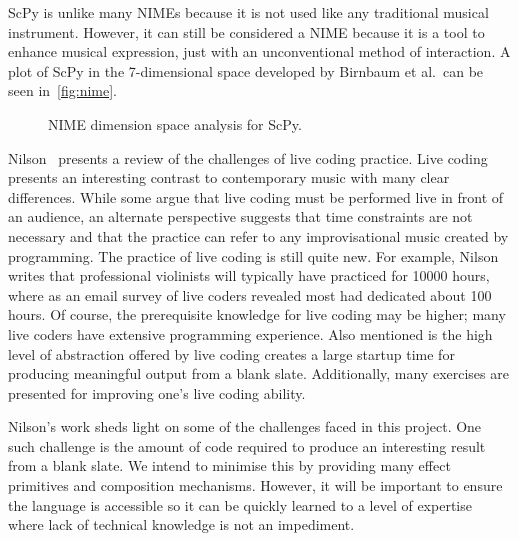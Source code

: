 \documentclass{article}
\begin{document}
ScPy is unlike many NIMEs because it is not used like any traditional musical instrument.
However, it can still be considered a NIME because it is a tool to enhance musical expression,
just with an unconventional method of interaction. A plot of ScPy in the 7-dimensional space
developed by Birnbaum et al.\ can be seen in~\autoref{fig:nime}.

\begin{figure}[ht]
    \caption{NIME dimension space analysis for ScPy.}\label{fig:nime}
    \begin{center}
    \end{center}
\end{figure}

Nilson~\cite{nilson2007live} presents a review of the challenges of live coding practice. Live
coding presents an interesting contrast to contemporary music with many clear differences.  While
some argue that live coding must be performed live in front of an audience, an alternate
perspective suggests that time constraints are not necessary and that the practice can refer to any
improvisational music created by programming. The practice of live coding is still quite new.
For example, Nilson writes that professional violinists will typically have practiced for 10000 hours, where
as an email survey of live coders revealed most had dedicated about 100 hours. Of course, the
prerequisite knowledge for live coding may be higher; many live coders have extensive programming
experience. Also mentioned is the high level of abstraction offered by live coding creates a large
startup time for producing meaningful output from a blank slate.  Additionally, many exercises are
presented for improving one's live coding ability.

Nilson's work sheds light on some of the challenges faced in this project.
One such challenge is the amount of code required to produce an interesting result from a blank
slate. We intend to minimise this by providing many effect primitives and composition
mechanisms. However, it will be important to ensure the language is accessible so it can be
quickly learned to a level of expertise where lack of technical knowledge is not an impediment.
\end{document}
